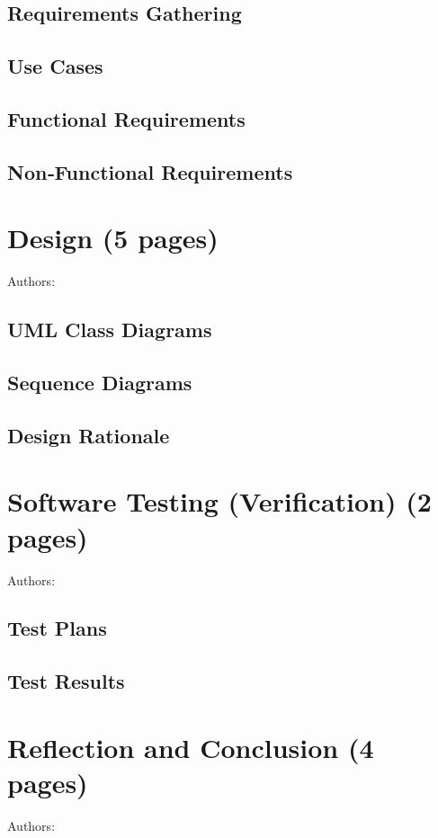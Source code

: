 \documentclass[12pt,a4paper]{article}
\begin{document}
\subsection{Requirements Gathering}

\subsection{Use Cases}

\subsection{Functional Requirements}

\subsection{Non‑Functional Requirements}


\section{Design (5 pages)}
Authors:
\label{sec:design}
\subsection{UML Class Diagrams}

\subsection{Sequence Diagrams}

\subsection{Design Rationale}


\section{Software Testing (Verification) (2 pages)}
Authors:
\label{sec:testing}
\subsection{Test Plans}

\subsection{Test Results}


\section{Reflection and Conclusion (4 pages)}
Authors:
\label{sec:reflection}
\end{document}
